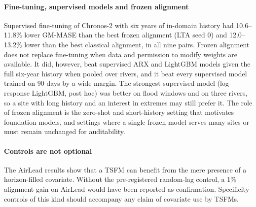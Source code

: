 \documentclass[preprint,11pt,authoryear]{elsarticle}
\newcommand{\lta}{\textsc{LTA}}
\begin{document}
\paragraph{Fine-tuning, supervised models and frozen alignment} Supervised fine-tuning of Chronos-2 with six years of in-domain history had 10.6--11.8\% lower GM-MASE than the best frozen alignment (\lta{} seed 0) and 12.0--13.2\% lower than the best classical alignment, in all nine pairs. Frozen alignment does not replace fine-tuning when data and permission to modify weights are available. It did, however, beat supervised ARX and LightGBM models given the full six-year history when pooled over rivers, and it beat every supervised model trained on 90 days by a wide margin. The strongest supervised model (log-response LightGBM, post hoc) was better on flood windows and on three rivers, so a site with long history and an interest in extremes may still prefer it. The role of frozen alignment is the zero-shot and short-history setting that motivates foundation models, and settings where a single frozen model serves many sites or must remain unchanged for auditability.

\paragraph{Controls are not optional} The AirLead results show that a TSFM can benefit from the mere presence of a horizon-filled covariate. Without the pre-registered random-lag control, a 1\% alignment gain on AirLead would have been reported as confirmation. Specificity controls of this kind should accompany any claim of covariate use by TSFMs.
\end{document}
